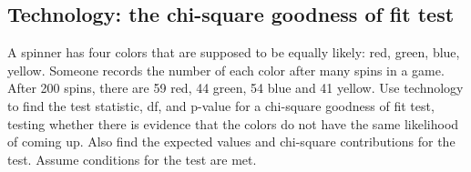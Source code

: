 \D{\newpage}

\subsection{Technology: the chi-square goodness of fit test}
\label{techGOF}

\noindent A spinner has four colors that are supposed to be equally likely:  red, green, blue, yellow.  Someone records the number of each color after many spins in a game.  After 200 spins, there are 59 red, 44 green, 54 blue and 41 yellow.  Use technology to find the test statistic, df, and p-value for a chi-square goodness of fit test, testing whether there is evidence that the colors do not have the same likelihood of coming up.  Also find the expected values and chi-square contributions for the test.  Assume conditions for the test are met. \\

